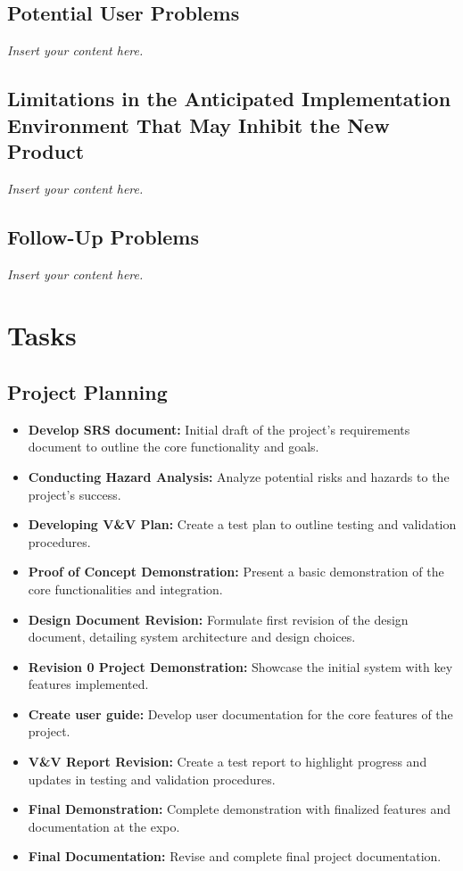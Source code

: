\documentclass[12pt]{article}
\newcommand{\lips}{\textit{Insert your content here.}}
\begin{document}
\subsection{Potential User Problems}
\lips
\subsection{Limitations in the Anticipated Implementation Environment That May
Inhibit the New Product}
\lips
\subsection{Follow-Up Problems}
\lips

\section{Tasks}
\subsection{Project Planning}
\begin{itemize}
  \item \textbf{Develop SRS document:}  Initial draft of the project's requirements document to outline the core functionality and goals.
  \item \textbf{Conducting Hazard Analysis:} Analyze potential risks and hazards to the project’s success.

  \item \textbf{Developing V\&V Plan:} Create a test plan to outline testing and validation procedures.
  \item \textbf{Proof of Concept Demonstration:} Present a basic demonstration of the core functionalities and integration.
  \item \textbf{Design Document Revision:} Formulate first revision of the design document, detailing system architecture and design choices.
  \item \textbf{Revision 0 Project Demonstration:}  Showcase the initial system with key features implemented.
  \item \textbf{Create user guide:} Develop user documentation for the core features of the project.
  \item \textbf{V\&V Report Revision:} Create a test report to highlight progress and updates in testing and validation procedures.
  \item \textbf{Final Demonstration:} Complete demonstration with finalized features and documentation at the expo.
  \item \textbf{Final Documentation:} Revise and complete final project documentation.
\end{itemize}
\end{document}
